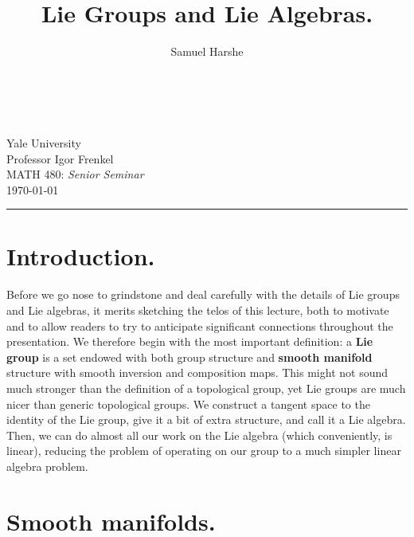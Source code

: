 \documentclass[12pt]{article}
\title{Lie Groups and Lie Algebras.}
\author{Samuel Harshe}
\begin{document}
\makeatletter
\begin{titlepage}
    \begin{center}
        \vspace*{2.5in}
        {\selectfont \huge
        \bfseries \@title}\\
        \vspace*{2.5in}
        \onehalfspacing%
        \@author\\
        Yale University\\
        Professor Igor Frenkel\\
        MATH 480: \textit{Senior Seminar} \\
        \today \\
    \end{center}
\end{titlepage}

\onehalfspacing%
\tableofcontents
\vspace{6pt}
\noindent\rule{\textwidth}{1.5pt}

\section{Introduction.}
\par{Before we go nose to grindstone and deal
carefully with the details of Lie groups and Lie
algebras, it merits sketching the telos of this
lecture, both to motivate and to allow readers to
try to anticipate significant connections
throughout the presentation. We therefore begin
with the most important definition: a \textbf{Lie
group} is a set endowed with both group structure
and \textbf{smooth manifold} structure with smooth
inversion and composition maps. This might not
sound much stronger than the definition of a
topological group, yet Lie groups are much nicer
than generic topological groups. We construct a
tangent space to the identity of the Lie group,
give it a bit of extra structure, and call it a
Lie algebra. Then, we can do almost all our work
on the Lie algebra (which conveniently, is
linear), reducing the problem of operating on our
group to a much simpler linear algebra problem.} 

\section{Smooth manifolds.}
\end{document}
